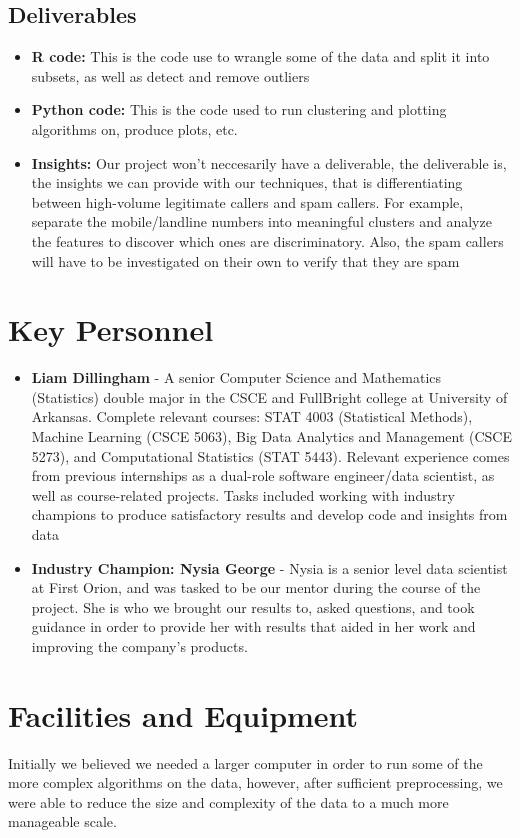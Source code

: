 \documentclass[20pt]{article} %
\begin{document}
\subsection{Deliverables}
\begin{itemize}
\item \textbf{R code:} This is the code use to wrangle some of the data and split it into subsets, as well as detect and remove outliers
\item \textbf{Python code:} This is the code used to run clustering and plotting algorithms on, produce plots, etc.
\item \textbf{Insights:} Our project won't neccesarily have a deliverable, the deliverable is, the insights we can provide with our techniques, that is differentiating between high-volume legitimate callers and spam callers. For example, separate the mobile/landline numbers into meaningful clusters and analyze the features to discover which ones are discriminatory. Also, the spam callers will have to be investigated on their own to verify that they are spam
\end{itemize}

\section{Key Personnel} 
\begin{itemize}
\item \textbf{Liam Dillingham} - A senior Computer Science and Mathematics (Statistics) double major in the CSCE and FullBright college at University of Arkansas.  Complete relevant courses: STAT 4003 (Statistical Methods), Machine Learning (CSCE 5063), Big Data Analytics and Management (CSCE 5273), and Computational Statistics (STAT 5443).  Relevant experience comes from previous internships as a dual-role software engineer/data scientist, as well as course-related projects.  Tasks included working with industry champions to produce satisfactory results and develop code and insights from data

\item \textbf{Industry Champion: Nysia George} - Nysia is a senior level data scientist at First Orion, and was tasked to be our mentor during the course of the project.  She is who we brought our results to, asked questions, and took guidance in order to provide her with results that aided in her work and improving the company's products.
\end{itemize}

\section{Facilities and Equipment}
Initially we believed we needed a larger computer in order to run some of the more complex algorithms on the data, however, after sufficient preprocessing, we were able to reduce the size and complexity of the data to a much more manageable scale.
\end{document}
